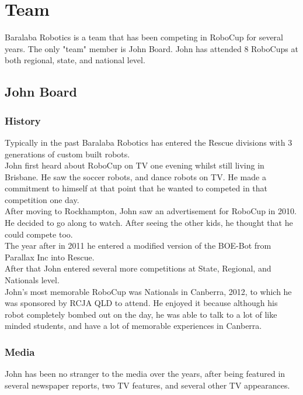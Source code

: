 \chapter{Team}
	Baralaba Robotics is a team that has been competing in RoboCup for several years. The only "team" member is John Board. John has attended 8 RoboCups at both regional, state, and national level.\\
	
	\section{John Board}
		\subsection{History}
			Typically in the past Baralaba Robotics has entered the Rescue divisions with 3 generations of custom built robots.\\
			
			John first heard about RoboCup on TV one evening whilst still living in Brisbane. He saw the soccer robots, and dance robots on TV. He made a commitment to himself at that point that he wanted to competed in that competition one day.\\
			
			After moving to Rockhampton, John saw an advertisement for RoboCup in 2010. He decided to go along to watch. After seeing the other kids, he thought that he could compete too.\\
			
			The year after in 2011 he entered a modified version of the BOE-Bot from Parallax Inc into Rescue.\\
			
			After that John entered several more competitions at State, Regional, and Nationals level. \\
			
			John's most memorable RoboCup was Nationals in Canberra, 2012, to which he was sponsored by RCJA QLD to attend. He enjoyed it because although his robot completely bombed out on the day, he was able to talk to a lot of like minded students, and have a lot of memorable experiences in Canberra.\\
			
		\subsection{Media}
			John has been no stranger to the media over the years, after being featured in several newspaper reports, two TV features, and several other TV appearances.\\
			
